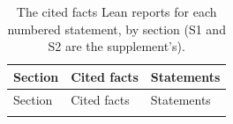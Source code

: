 {\small
\begin{longtable}{l>{\raggedright\arraybackslash}p{}>{\raggedright\arraybackslash}p{}}
\caption{The cited facts Lean reports for each numbered statement, by section (S1 and S2 are
the supplement's).}
\label{tab:statements}\\
\toprule
Section & Cited facts & Statements \\
\midrule
\endfirsthead
\toprule
Section & Cited facts & Statements \\
\midrule
\endhead
\bottomrule
\endlastfoot

\end{longtable}
}
